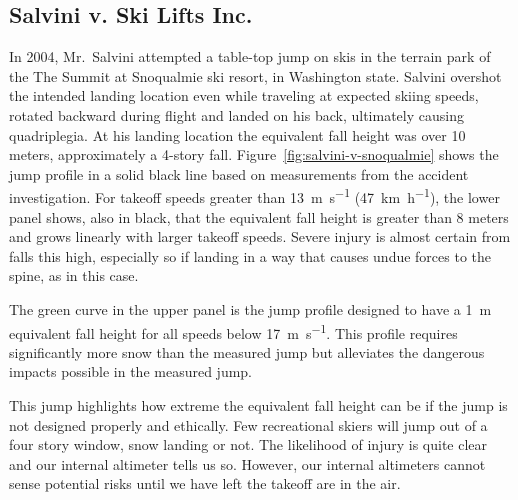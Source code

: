 \documentclass{article}
\begin{document}
\subsection{Salvini v. Ski Lifts Inc.}
%
In 2004, Mr.~Salvini attempted a table-top jump on skis in the terrain
park of the The Summit at Snoqualmie ski resort, in Washington state.
Salvini overshot the intended
landing location even while traveling at expected skiing speeds, rotated 
backward during flight and landed on his back, ultimately causing
quadriplegia. At his landing location the equivalent fall height was over 10
meters, approximately a 4-story fall.
Figure~\ref{fig:salvini-v-snoqualmie} shows the jump
profile in a solid black line based on measurements from the accident investigation.
For takeoff speeds greater than 13~\si{\meter\per\second}
(47~\si{\kilo\meter\per\hour}), the lower panel shows, also in black, that the
equivalent fall height is greater than 8 meters and grows linearly with larger
takeoff speeds. Severe injury is almost certain from falls this high,
especially so if landing in a way that causes undue forces to the spine, as in
this case.

The green curve in the upper panel is the jump profile designed to have a
1~\si{\meter} equivalent fall height for all speeds below
17~\si{\meter\per\second}. This profile requires significantly more snow than
the measured jump but alleviates the dangerous impacts possible in the measured
jump.

This jump highlights how extreme the equivalent fall height can be if the jump
is not designed properly and ethically. Few recreational skiers will jump out of a four story window,
snow landing or not. The likelihood of injury is quite clear and our internal
altimeter tells us so. However, our internal altimeters cannot sense potential risks until we have left the takeoff are in the air.
%
\end{document}
